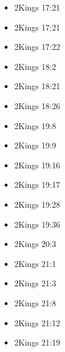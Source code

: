 \documentclass[14pt]{book}
\begin{document}
\begin{multicols}{2}
\begin{itemize}
													\item 2Kings 17:21
													
													\item 2Kings 17:21
													
													\item 2Kings 17:22
													
													\item 2Kings 18:2
													
													\item 2Kings 18:21
													
													\item 2Kings 18:26
													
													\item 2Kings 19:8
													
													\item 2Kings 19:9
													
													\item 2Kings 19:16
													
													\item 2Kings 19:17
													
													\item 2Kings 19:28
													
													\item 2Kings 19:36
													
													\item 2Kings 20:3
													
													\item 2Kings 21:1
													
													\item 2Kings 21:3
													
													\item 2Kings 21:8
													
													\item 2Kings 21:12
													
													\item 2Kings 21:19
													

\end{itemize}
\end{multicols}
\end{document}
